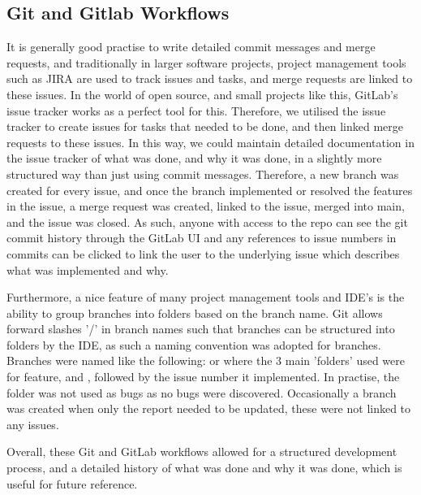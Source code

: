     \subsection{Git and Gitlab Workflows}\label{subsec:git-and-gitlab-pipeline}
    It is generally good practise to write detailed commit messages and merge requests, and traditionally in larger
    software projects, project management tools such as JIRA are used to track issues and tasks, and merge requests
    are linked to these issues.
    In the world of open source, and small projects like this, GitLab's issue tracker works as a perfect tool for this.
    Therefore, we utilised the issue tracker to create issues for tasks that needed to be done, and then linked merge requests
    to these issues.
    In this way, we could maintain detailed documentation in the issue tracker of what was done, and why it was done,
    in a slightly more structured way than just using commit messages.
    Therefore, a new branch was created for every issue, and once the branch implemented or resolved the features in the
    issue, a merge request was created, linked to the issue, merged into main, and the issue was closed.
    As such, anyone with access to the repo can see the git commit history through the GitLab UI and any references to issue
    numbers in commits can be clicked to link the user to the underlying issue which describes what was implemented and why.

    Furthermore, a nice feature of many project management tools and IDE's is the ability to group branches into folders
    based on the branch name.
    Git allows forward slashes '/' in branch names such that branches can be structured into folders by the IDE, as such
    a naming convention was adopted for branches.
    Branches were named like the following:  or  where the 3 main
    'folders' used were  for feature,  and , followed by
    the issue number it implemented.
    In practise, the  folder was not used as bugs as no bugs were discovered.
    Occasionally a  branch was created when only the report needed to be updated, these were not linked
    to any issues.

    Overall, these Git and GitLab workflows allowed for a structured development process, and a detailed history of
    what was done and why it was done, which is useful for future reference.

